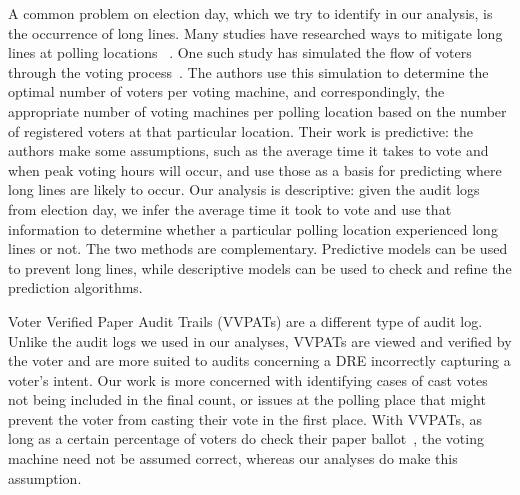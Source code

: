 A common problem on election day, which we try to identify in our analysis, is the occurrence of long lines. Many studies have researched ways to mitigate long lines at polling locations ~\cite{Allen2006,Dow2007,Spencer2010,Wilson2008,Edel2010}.  One such study has simulated the flow of voters through the voting process~\cite{Edel2010}. The authors use this simulation to determine the optimal number of voters per voting machine, and correspondingly, the appropriate number of voting machines per polling location based on the number of registered voters at that particular location. Their work is predictive: the authors make some assumptions, such as the average time it takes to vote and when peak voting hours will occur, and use those as a basis for predicting where long lines are likely to occur. Our analysis is descriptive: given the audit logs from election day, we infer the average time it took to vote and use that information to determine whether a particular polling location experienced long lines or not. The two methods are complementary. Predictive models can be used to prevent long lines, while descriptive models can be used to check and refine the prediction algorithms. 

Voter Verified Paper Audit Trails (VVPATs) are a different type of audit log. Unlike the audit logs we used in our analyses, VVPATs are viewed and verified by the voter and are more suited to audits concerning a DRE incorrectly capturing a voter\textquoteright s intent. Our work is more concerned with identifying cases of cast votes not being included in the final count, or issues at the polling place that might prevent the voter from casting their vote in the first place. With VVPATs, as long as a certain percentage of voters do check their paper ballot~\cite{Hall2006}, the voting machine need not be assumed correct, whereas our analyses do make this assumption.
